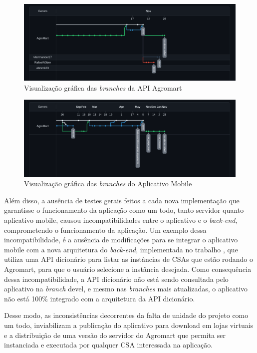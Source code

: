 \begin{figure}[h]
	\centering
	\includegraphics[keepaspectratio=true,scale=0.35]{figuras/agromart_api.png}
	\caption{Visualização gráfica das \textit{branches} da API Agromart}
	\label{agromart_api}
\end{figure}

\begin{figure}[h]
	\centering
	\includegraphics[keepaspectratio=true,scale=0.35]{figuras/agromart_app.png}
	\caption{Visualização gráfica das \textit{branches} do Aplicativo Mobile}
	\label{agromart_app}
\end{figure}

Além disso, a ausência de testes gerais feitos a cada nova implementação que garantisse o funcionamento da aplicação como um todo, tanto servidor quanto aplicativo mobile, causou incompatibilidades entre o aplicativo e o \textit{back-end}, comprometendo o funcionamento da aplicação. Um exemplo dessa incompatibilidade, é a ausência de modificações para se integrar o aplicativo mobile com a nova arquitetura do \textit{back-end}, implementada no trabalho \cite{cellaefreitas2023}, que utiliza uma API dicionário para listar as instâncias de CSAs que estão rodando o Agromart, para que o usuário selecione a instância desejada. Como consequência dessa incompatibilidade, a API dicionário não está sendo consultada pelo aplicativo na \textit{branch} devel, e mesmo nas \textit{branches} mais atualizadas, o aplicativo não está 100\% integrado com a arquitetura da API dicionário.

Desse modo, as inconsistências decorrentes da falta de unidade do projeto como um todo, inviabilizam a publicação do aplicativo para download em lojas virtuais e a distribuição de uma versão do servidor do Agromart que permita ser instanciada e executada por qualquer CSA interessada na aplicação.

